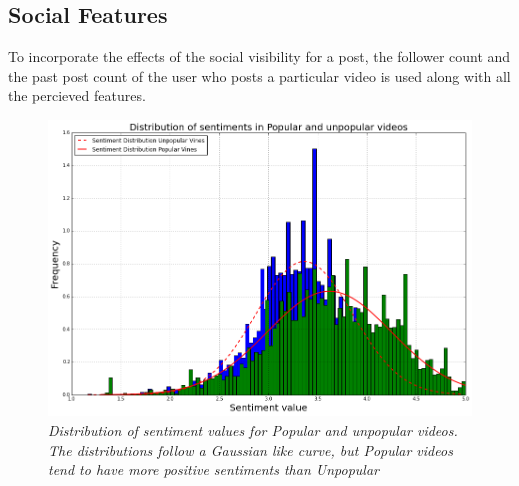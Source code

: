\subsection{Social Features}
To incorporate the effects of the social visibility for a post, the follower count and the past post count of the user who posts a particular video is used along with all the percieved features. 

\begin{figure}[!htb]
\centering
\includegraphics[width=\columnwidth]{plots/DistributionSentiments}
\caption{\textsl{ Distribution of sentiment values for Popular and unpopular videos. The distributions follow a Gaussian like curve, but Popular videos tend to have more positive sentiments than Unpopular }}
\label{fig:Senti_distribution}
\end{figure}


